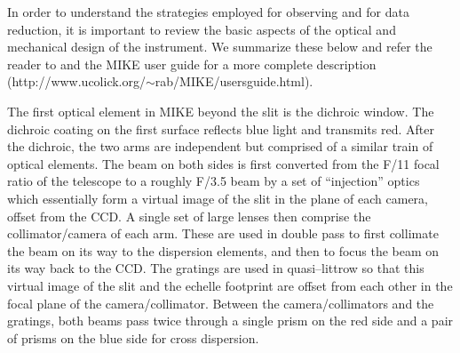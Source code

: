 \documentclass[12pt,preprint]{aastex}
\begin{document}
In order to understand the strategies employed for observing and
for data reduction,
it is important to review the basic aspects of the optical and
mechanical design of the instrument.  We summarize  these below and
refer the reader to \cite{mike} and the MIKE user guide for
a more complete description
(http://www.ucolick.org/$\sim$rab/MIKE/usersguide.html). 

The first optical element in MIKE beyond the slit is the dichroic
window.  The dichroic coating on the first surface reflects blue light
and transmits red.  After the dichroic, the two arms are independent
but comprised of a similar train of optical elements.  The beam on
both sides is first converted from the F/11 focal ratio of the
telescope to a roughly F/3.5 beam by a set of ``injection'' optics
which essentially form a virtual image of the slit in the plane of each
camera, offset from the CCD.  A single set of large lenses then
comprise the collimator/camera of each arm.  These are used in double
pass to first collimate the beam on its way to the dispersion elements,
and then to focus the beam on its way back to the CCD.  The gratings are used
in quasi--littrow so that this virtual image of the slit 
and the echelle footprint are offset from each other in the focal plane of the
camera/collimator. Between the camera/collimators and the gratings,
both beams pass twice through a single prism on the red side and a
pair of prisms on the blue side for cross dispersion.

%

\end{document}
